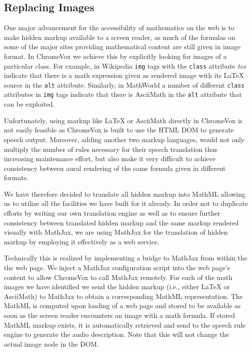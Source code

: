 \documentclass{sig-alternate}
\begin{document}
\subsection{Replacing Images}
\label{sec:images}

One major advancement for the accessibility of mathematics on the web is to make
hidden markup available to a screen reader, as much of the formulas on some of
the major sites providing mathematical content are still given in image format.
In ChromeVox we achieve this by explicitly looking for images of a particular
class.  For example, in Wikipedia \texttt{img} tags with the \texttt{class}
attribute \emph{tex} indicate that there is a math expression given as rendered
image with its {\LaTeX} source in the \texttt{alt} attribute.  Similarly, in
MathWorld a number of different \texttt{class} attributes in \texttt{img} tags
indicate that there is AsciiMath in the \texttt{alt} attribute that can be
exploited.

Unfortunately, using markup like {\LaTeX} or AsciiMath directly in ChromeVox is
not easily feasible as ChromeVox is built to use the HTML DOM to generate speech
output. Moreover, adding another two markup languages, would not only multiply
the number of rules necessary for their speech translation thus increasing
maintenance effort, but also make it very difficult to achieve consistency
between aural rendering of the same formula given in different formats.

We have therefore decided to translate all hidden markup into MathML allowing us
to utilize all the facilities we have built for it already. In order not to
duplicate efforts by writing our own translation engine as well as to ensure
further consistency between translated hidden markup and the same markup
rendered visually with MathJax, we are using MathJax for the translation of
hidden markup by employing it effectively as a web service.

Technically this is realized by implementing a bridge to MathJax from within the
the web page. We inject a MathJax configuration script into the web page's
content to allow ChromeVox to call MathJax remotely. For each of the math images
we have identified we send the hidden markup (i.e., either {\LaTeX} or
AsciiMath) to MathJax to obtain a corresponding MathML representation. The
MathML is computed upon loading of a web page and stored to be available as soon
as the screen reader encounters an image with a math formula. If stored MathML
markup exists, it is automatically retrieved and send to the speech rule engine
to generate the audio description. Note that this will not change the actual
image node in the DOM.
\end{document}
